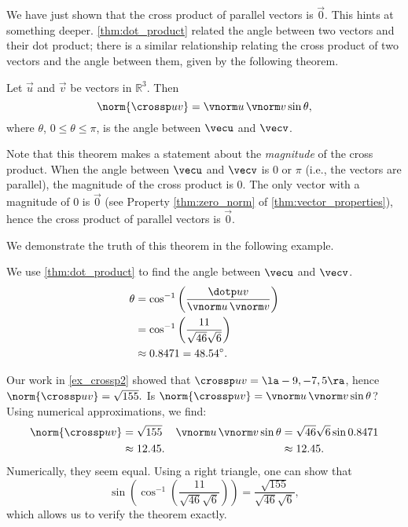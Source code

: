 We have just shown that the cross product of parallel vectors is $\vec 0$. This hints at something deeper. \autoref{thm:dot_product} related the angle between two vectors and their dot product; there is a similar relationship relating the cross product of two vectors and the angle between them, given by the following theorem.

{Let $\vec u$ and $\vec v$ be vectors in $\mathbb{R}^3$. Then
$$\norm{\crossp uv} = \vnorm u\, \vnorm v \sin\theta,$$
where $\theta$, $0\leq \theta \leq \pi$, is the angle between $\vecu$ and $\vecv$.
}


Note that this theorem makes a statement about the \emph{magnitude} of the cross product. When the angle between $\vecu$ and $\vecv$ is 0 or $\pi$ (i.e., the vectors are parallel), the magnitude of the cross product is 0. The only vector with a magnitude of 0 is $\vec 0$ (see Property \ref{thm:zero_norm} of \autoref{thm:vector_properties}), hence the cross product of  parallel vectors is $\vec 0$.\bigskip

We demonstrate the truth of this theorem in the following example.

{We use \autoref{thm:dot_product} to find the angle between $\vecu$ and $\vecv$. 
\begin{align*}
\theta &= \cos^{-1}\left(\frac{\dotp uv}{\vnorm u\, \vnorm v}\right) \\
			&= \cos^{-1}\left(\frac{11}{\sqrt{46}\sqrt{6}}\right)\\
			&\approx 0.8471 = 48.54^\circ.
\end{align*}

Our work in \autoref{ex_crossp2} showed that $\crossp uv = \la -9,-7,5\ra$, hence $\norm{\crossp uv} = \sqrt{155}.$ Is $\norm{\crossp uv} = \vnorm u\, \vnorm v\sin\theta$? Using numerical approximations, we find:
\begin{align*}
\norm{\crossp uv} &=\sqrt{155}  & \vnorm u\,\vnorm v \sin\theta & = \sqrt{46}\sqrt{6}\sin 0.8471\\
									&\approx 12.45. & &\approx 12.45.
\end{align*}
Numerically, they seem equal. Using a right triangle, one can show that 
$$\sin\left(\cos^{-1}\left(\frac{11}{\sqrt{46}\sqrt{6}}\right)\right) = \frac{\sqrt{155}}{\sqrt{46}\sqrt{6}},$$ which allows us to verify the theorem exactly.}

